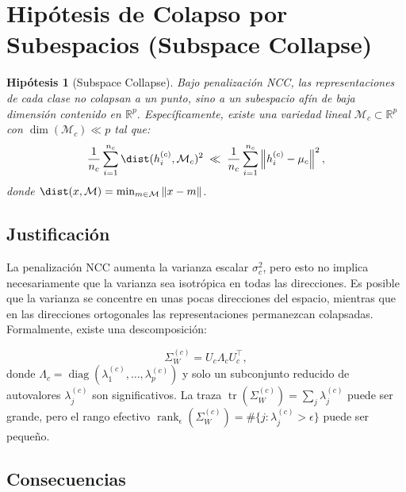 \documentclass[12pt,a4paper]{report}
\newtheorem{hypothesis}{Hipótesis}[chapter]
\newcommand{\R}{\mathbb{R}}
\newcommand{\norm}[1]{\left\lVert#1\right\rVert}
\newcommand{\tr}{\operatorname{tr}}
\newcommand{\diag}{\operatorname{diag}}
\newcommand{\rank}{\operatorname{rank}}
\begin{document}
\section{Hipótesis de Colapso por Subespacios (Subspace Collapse)}
\label{sec:subspace}

\begin{hypothesis}[Subspace Collapse]
Bajo penalización NCC, las representaciones de cada clase no colapsan a un punto, sino a un subespacio afín de baja dimensión contenido en $\R^p$. Específicamente, existe una variedad lineal $\mathcal{M}_c \subset \R^p$ con $\dim(\mathcal{M}_c) \ll p$ tal que:
\begin{equation}
    \frac{1}{n_c}\sum_{i=1}^{n_c} \dist(h_i^{(c)}, \mathcal{M}_c)^2 \;\ll\; \frac{1}{n_c}\sum_{i=1}^{n_c} \norm{h_i^{(c)} - \mu_c}^2,
\end{equation}
donde $\dist(x, \mathcal{M}) = \min_{m \in \mathcal{M}} \norm{x - m}$.
\end{hypothesis}

\subsection{Justificación}

La penalización NCC aumenta la varianza escalar $\sigma_c^2$, pero esto no implica necesariamente que la varianza sea isotrópica en todas las direcciones. Es posible que la varianza se concentre en unas pocas direcciones del espacio, mientras que en las direcciones ortogonales las representaciones permanezcan colapsadas. Formalmente, existe una descomposición:

\begin{equation}
    \Sigma_W^{(c)} = U_c \Lambda_c U_c^\top,
\end{equation}
donde $\Lambda_c = \diag(\lambda_1^{(c)}, \ldots, \lambda_p^{(c)})$ y solo un subconjunto reducido de autovalores $\lambda_j^{(c)}$ son significativos. La traza $\tr(\Sigma_W^{(c)}) = \sum_j \lambda_j^{(c)}$ puede ser grande, pero el rango efectivo $\rank_\epsilon(\Sigma_W^{(c)}) = \#\{j : \lambda_j^{(c)} > \epsilon\}$ puede ser pequeño.

\subsection{Consecuencias}
\end{document}
